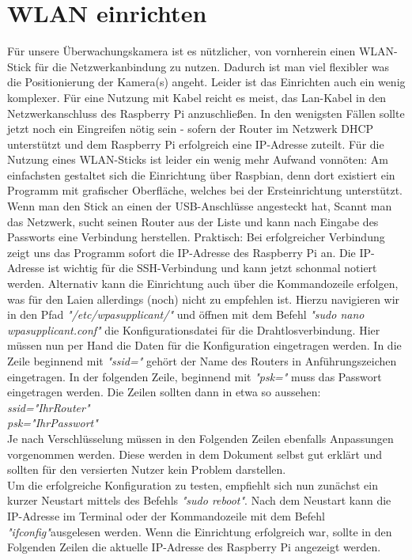 \documentclass[12pt,a4paper]{scrreprt}
\begin{document}
\section{WLAN einrichten}
Für unsere Überwachungskamera ist es nützlicher, von vornherein einen WLAN-Stick für die Netzwerkanbindung zu nutzen. Dadurch ist man viel flexibler was die Positionierung der Kamera(s) angeht. Leider ist das Einrichten auch ein wenig komplexer. Für eine Nutzung mit Kabel reicht es meist, das Lan-Kabel in den Netzwerkanschluss des Raspberry Pi anzuschließen. In den wenigsten Fällen sollte jetzt noch ein Eingreifen nötig sein - sofern der Router im Netzwerk DHCP unterstützt und dem Raspberry Pi erfolgreich eine IP-Adresse zuteilt. Für die Nutzung eines WLAN-Sticks ist leider ein wenig mehr Aufwand vonnöten: Am einfachsten gestaltet sich die Einrichtung über Raspbian, denn dort existiert ein Programm mit grafischer Oberfläche, welches bei der Ersteinrichtung unterstützt.  Wenn man den Stick an einen der USB-Anschlüsse angesteckt hat, Scannt man das Netzwerk, sucht seinen Router aus der Liste und kann nach Eingabe des Passworts eine Verbindung herstellen. Praktisch: Bei erfolgreicher Verbindung zeigt uns das Programm sofort die IP-Adresse des Raspberry Pi an. Die IP-Adresse ist wichtig für die SSH-Verbindung und kann jetzt schonmal notiert werden. Alternativ kann die Einrichtung auch über die Kommandozeile erfolgen, was für den Laien allerdings (noch) nicht zu empfehlen ist. Hierzu navigieren wir in den Pfad \textit{"/etc/wpasupplicant/"} und öffnen mit dem Befehl \textit{"sudo nano wpasupplicant.conf"} die Konfigurationsdatei für die Drahtlosverbindung. Hier müssen nun per Hand die Daten für die Konfiguration eingetragen werden. In die Zeile beginnend mit \textit{"ssid="} gehört der Name des Routers in Anführungszeichen eingetragen. In der folgenden Zeile, beginnend mit \textit{"psk="} muss das Passwort eingetragen werden. Die Zeilen sollten dann in etwa so aussehen: \\ \textit{ssid="IhrRouter"\\psk="IhrPasswort"}\\ Je nach Verschlüsselung müssen in den Folgenden Zeilen ebenfalls Anpassungen vorgenommen werden. Diese werden in dem Dokument selbst gut erklärt und sollten für den versierten Nutzer kein Problem darstellen.\\ Um die erfolgreiche Konfiguration zu testen, empfiehlt sich nun zunächst ein kurzer Neustart mittels des Befehls \textit{"sudo reboot"}. Nach dem Neustart kann die IP-Adresse im Terminal oder der Kommandozeile mit dem Befehl \textit{"ifconfig"}ausgelesen werden. Wenn die Einrichtung erfolgreich war, sollte in den Folgenden Zeilen die aktuelle IP-Adresse des Raspberry Pi angezeigt werden.
\end{document}
